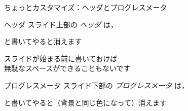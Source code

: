 {

\begin{frame}{ちょっとカスタマイズ：ヘッダとプログレスメータ}
\begin{block}{ヘッダ}
    スライド上部の \emph{ヘッダ} は，
    
    と書いてやると消えます
    \begin{itemize}
    \okitem
      スライドが始まる前に書いておけば\\
      無駄なスペースができることもないです
    \end{itemize}
\end{block}

\begin{block}{プログレスメータ}
    スライド下部の \emph{プログレスメータ} は，
    
    と書いてやると（背景と同じ色になって）消えます
  \end{block}

\end{frame}
}

